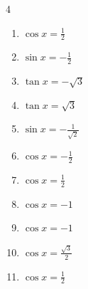 \begin{multicols}{4}
\begin{enumerate}

  \item $\displaystyle \cos{x}  = \frac{1}{2}$


\columnbreak %

\resetques

  \item $\displaystyle \sin{x}  = -\frac{1}{2}$


  \item $\displaystyle \tan{x}  = -\sqrt{3}$


  \item $\displaystyle \tan{x}  = \sqrt{3}$


  \item $\displaystyle \sin{x}  = -\frac{1}{\sqrt{2}}$


  \item $\displaystyle \cos{x}  = -\frac{1}{2}$


  \item $\displaystyle \cos{x}  = \frac{1}{2}$


  \item $\displaystyle \cos{x}  = -1$


  \item $\displaystyle \cos{x}  = -1$


  \item $\displaystyle \cos{x}  = \frac{\sqrt{3}}{2}$


  \item $\displaystyle \cos{x}  = \frac{1}{2}$


\end{enumerate}
\end{multicols}
